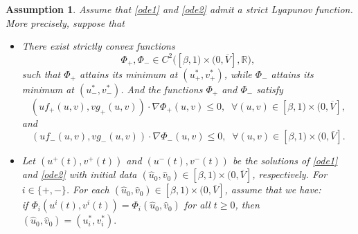 \documentclass[10pt]{article}
\numberwithin{equation}{section}
\newtheorem{assumption}[theorem]{Assumption}
\begin{document}
  
 \begin{assumption}\label{Ass-LF}
 Assume  that  \eqref{ode1} and \eqref{ode2} admit   a strict Lyapunov function.    More precisely,  suppose that
 \begin{itemize}
 \item[(i)]  There exist strictly convex functions
  $$
  \Phi_{+},\Phi_{-}\in C^2\big([\beta,1)\times(0,\overline V],\mathbb R\big),
  $$
  such that \(\Phi_{+} \) attains its minimum at \((u_+^* , v_+^*) \), while \(\Phi_{-}\) attains its minimum at \((u_-^*,v_-^*)\).  And the functions  $\Phi_{+}$ and $\Phi_{-}$ satisfy
 \begin{equation*}
   (uf_+(u,v),  vg_+(u, v)) \cdot \nabla \Phi_{+} (u, v) \leq 0,  \;\; \forall (u, v) \in [\beta, 1)\times (0, \overline{V}],
 \end{equation*}
and 
 $$  (uf_-(u,v),  vg_-(u, v)) \cdot \nabla \Phi_{-} (u, v) \leq 0,   \;\;  \forall (u, v) \in [\beta, 1)\times (0, \overline{V}]. $$

\item[(ii)] Let   $( u^+(t),v^+(t) )$  and $( u^-(t),v^-(t) )$ be the  solutions of  \eqref{ode1} and \eqref{ode2}   with initial data $(\hat{u}_0,  \hat{v}_0) \in [\beta, 1)\times (0, \overline{V} ]$, respectively.  For   $i\in\{+, - \}$.   For each $(\hat{u}_0, \hat{v}_0) \in [\beta, 1)\times (0, \overline{V} ]$, assume that  we have: \\
if $\Phi_{i} (u^{i}(t), v^{i}(t) ) = \Phi_{i} (\hat{u}_0, \hat{v}_0)$  for all  $t\geq 0$, then 
$(\hat{u}_0, \hat{v}_0) = (u^*_{i}, v^*_{i}).  $

  \end{itemize}

 \end{assumption}
\end{document}
